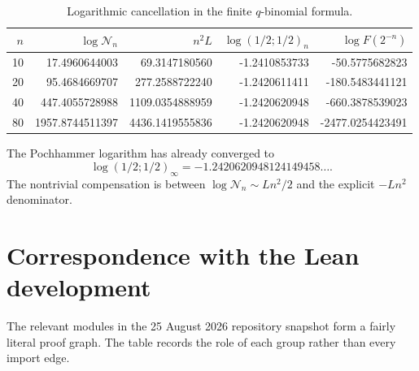 \documentclass[11pt,oneside]{article}
\theoremstyle{definition}
\theoremstyle{remark}
\begin{document}
\begin{table}[htbp]
\centering
\small
\begin{tabular}{@{}rrrrr@{}}
\toprule
$n$ & $\log\mathcal N_n$ & $n^2L$ & $\log(1/2;1/2)_n$ & $\log F(2^{-n})$\\
\midrule
10 & 17.4960644003 & 69.3147180560 & -1.2410853733 & -50.5775682823\\
20 & 95.4684669707 & 277.2588722240 & -1.2420611411 & -180.5483441121\\
40 & 447.4055728988& 1109.0354888959& -1.2420620948 & -660.3878539023\\
80 & 1957.8744511397&4436.1419555836& -1.2420620948 & -2477.0254423491\\
\bottomrule
\end{tabular}
\caption{Logarithmic cancellation in the finite $q$-binomial formula.}
\label{tab:q-cancellation}
\end{table}

The Pochhammer logarithm has already converged to
\begin{equation}
 \log(1/2;1/2)_\infty=-1.2420620948124149458\ldots.         \label{eq:qpoch-numeric}
\end{equation}
The nontrivial compensation is between $\log\mathcal N_n\sim Ln^2/2$ and the explicit
$-Ln^2$ denominator.

\section{Correspondence with the Lean development}
\label{sec:lean-map}

The relevant modules in the 25 August 2026 repository snapshot \cite{proveit2026}
form a fairly literal proof graph.  The table records the role of each group rather than every import edge.
\end{document}
